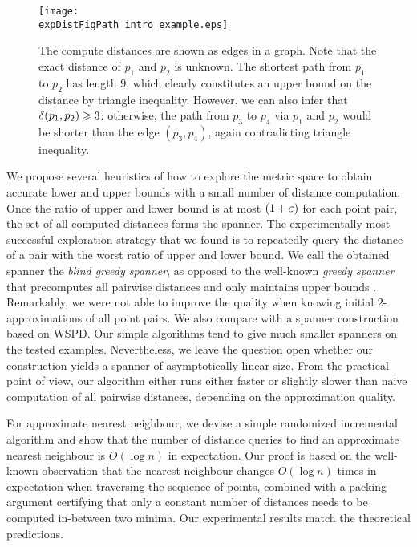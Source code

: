 \begin{figure}[h]
\centering
\texttt{[image: \\expDistFigPath  intro\_example.eps]}
\caption{The compute distances are shown as edges in a graph. Note that the exact distance
of $p_1$ and $p_2$ is unknown. The shortest path from $p_1$ to $p_2$ has length $9$, which clearly
constitutes an upper bound on the distance by triangle inequality.
However, we can also infer that $\delta(p_1,p_2)\geqslant 3$:
otherwise, the path from $p_3$ to $p_4$ via $p_1$ and $p_2$
would be shorter than the edge $(p_3,p_4)$, again contradicting
triangle inequality.}
\label{fig:1st_example}
\end{figure}

We propose several heuristics of how to explore the metric space to obtain accurate lower and upper bounds
with a small number of distance computation. Once the ratio of upper and lower bound is at most $(1+\varepsilon)$
for each point pair, the set of all computed distances forms the spanner.
The experimentally most successful exploration strategy that we found is to
repeatedly query the distance of a pair with the worst ratio of upper and lower bound.
We call the obtained spanner the \emph{blind greedy spanner}, as opposed to the well-known
\emph{greedy spanner} that precomputes all pairwise distances and only maintains upper bounds \cite{althofer1993sparse}.
Remarkably, we were not able to improve the quality when knowing initial $2$-approximations of all point pairs.
We also compare with a spanner construction based on WSPD. Our simple algorithms tend to give much smaller
spanners on the tested examples. Nevertheless, we leave the question open whether our construction
yields a spanner of asymptotically linear size. From the practical point of view, our algorithm either
runs either faster or slightly slower than naive computation of all pairwise distances, depending on the approximation quality.


For approximate nearest neighbour, we devise a simple randomized incremental algorithm and show that
the number of distance queries to find an approximate nearest neighbour is $O(\log n)$ in expectation.
Our proof is based on the well-known observation that the nearest neighbour changes $O(\log n)$ times
in expectation when traversing the sequence of points, combined with a packing argument certifying that
only a constant number of distances needs to be computed in-between two minima.
Our experimental results match the theoretical predictions.

